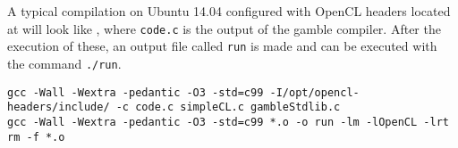 A typical compilation on Ubuntu 14.04 configured with OpenCL headers located at  will look like , where \texttt{code.c} is the output of the \gls{gamble} compiler.
After the execution of these, an output file called \texttt{run} is made and can be executed with the command \texttt{./run}. 

\begin{lstlisting}[caption=The commands executed by the make command according to the rules of the MakeFile,numbers=none,frame=tlrb,label={lst:makecommands}]
gcc -Wall -Wextra -pedantic -O3 -std=c99 -I/opt/opencl-headers/include/ -c code.c simpleCL.c gambleStdlib.c
gcc -Wall -Wextra -pedantic -O3 -std=c99 *.o -o run -lm -lOpenCL -lrt
rm -f *.o
\end{lstlisting}
